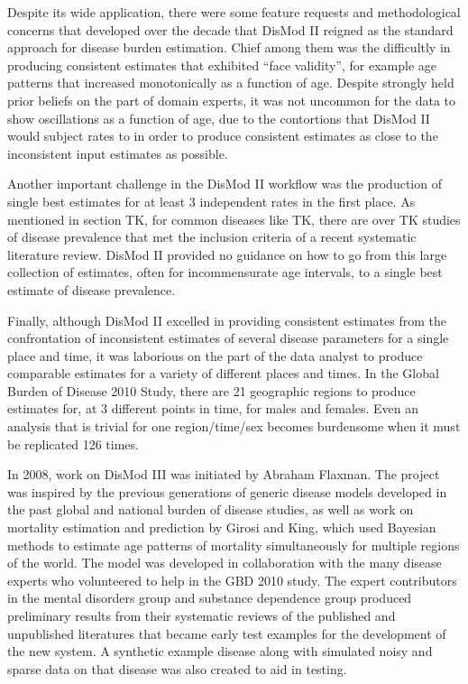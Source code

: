 Despite its wide application, there were some feature
requests and methodological concerns that developed over the decade
that DisMod II reigned as the standard approach for disease burden
estimation. Chief among them was the difficultly in producing consistent estimates
that exhibited ``face validity'', for example age patterns that
increased monotonically as a function of age. Despite strongly held
prior beliefs on the part of domain experts, it was not uncommon for
the data to show oscillations as a function of age, due to the
contortions that DisMod II would subject rates to in order to produce
consistent estimates as close to the inconsistent input estimates as
possible.

Another important challenge in the DisMod II workflow was the
production of single best estimates for at least 3 independent rates
in the first place. As mentioned in section TK, for common diseases
like TK, there are over TK studies of disease prevalence that met the
inclusion criteria of a recent systematic literature review. DisMod II
provided no guidance on how to go from this large collection of
estimates, often for incommensurate age intervals, to a single best
estimate of disease prevalence.

Finally, although DisMod II excelled in providing consistent estimates
from the confrontation of inconsistent estimates of several disease
parameters for a single place and time, it was laborious on the part
of the data analyst to produce comparable estimates for a variety of
different places and times. In the Global Burden of Disease 2010
Study, there are 21 geographic regions to produce estimates for, at 3
different points in time, for males and females. Even an analysis that
is trivial for one region/time/sex becomes burdensome when it must be
replicated 126 times.

In 2008, work on DisMod III was initiated by Abraham Flaxman. The
project was inspired by the previous generations of generic disease
models developed in the past global and national burden of disease
studies, as well as work on mortality estimation and prediction by
Girosi and King, which used Bayesian methods to estimate age patterns
of mortality simultaneously for multiple regions of the world. The
model was developed in collaboration with the many disease experts who
volunteered to help in the GBD 2010 study. The expert contributors in
the mental disorders group and substance dependence group produced
preliminary results from their systematic reviews of the published and
unpublished literatures that became early test examples for the
development of the new system. A synthetic example disease along with
simulated noisy and sparse data on that disease was also created to
aid in testing.

